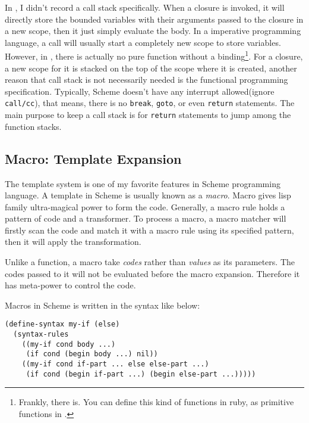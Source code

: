 In \revo, I didn't record a call stack specifically. When a closure is
invoked, it will directly store the bounded variables with their
arguments passed to the closure in a new scope, then it just simply
evaluate the body. In a imperative programming language, a call will
usually start a completely new scope to store variables. However, in
\revo, there is actually no pure function without a
binding\footnote{Frankly, there is. You can define this kind of
  functions in ruby, as primitive functions in \revo.}. For a closure,
a new scope for it is stacked on the top of the scope where it is
created, another reason that call stack is not necessarily needed is
the functional programming specification. Typically, Scheme doesn't
have any interrupt allowed(ignore \verb+call/cc+), that means, there
is no \verb+break+, \verb+goto+, or even \verb+return+ statements. The
main purpose to keep a call stack is for \verb+return+ statements to
jump among the function stacks.


\subsection{Macro: Template Expansion}
The template system is one of my favorite features in Scheme
programming language. A template in Scheme is usually known as a
\emph{macro}. Macro gives lisp family ultra-magical power to form the
code. Generally, a macro rule holds a pattern of code and a
transformer. To process a macro, a macro matcher will firstly scan the
code and match it with a macro rule using its specified pattern, then
it will apply the transformation.

Unlike a function, a macro take \emph{codes} rather than \emph{values}
as its parameters. The codes passed to it will not be evaluated before
the macro expansion. Therefore it has meta-power to control the code.

Macros in Scheme is written in the syntax like below:
\begin{verbatim}
(define-syntax my-if (else)
  (syntax-rules
    ((my-if cond body ...)
     (if cond (begin body ...) nil))
    ((my-if cond if-part ... else else-part ...)
     (if cond (begin if-part ...) (begin else-part ...)))))

\end{verbatim}







